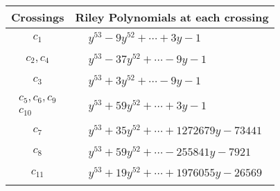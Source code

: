 \documentclass[1p]{elsarticle_modified}
\theoremstyle{definition}
\begin{document}
\begin{tabular}{m{50pt}|m{274pt}}
Crossings & \hspace{64pt}Riley Polynomials at each crossing \\
\hline $$\begin{aligned}c_{1}\end{aligned}$$&$\begin{aligned}
&y^{53}-9 y^{52}+\cdots+3 y-1
\end{aligned}$\\
\hline $$\begin{aligned}c_{2},c_{4}\end{aligned}$$&$\begin{aligned}
&y^{53}-37 y^{52}+\cdots-9 y-1
\end{aligned}$\\
\hline $$\begin{aligned}c_{3}\end{aligned}$$&$\begin{aligned}
&y^{53}+3 y^{52}+\cdots-9 y-1
\end{aligned}$\\
\hline $$\begin{aligned}c_{5},c_{6},c_{9}\\c_{10}\end{aligned}$$&$\begin{aligned}
&y^{53}+59 y^{52}+\cdots+3 y-1
\end{aligned}$\\
\hline $$\begin{aligned}c_{7}\end{aligned}$$&$\begin{aligned}
&y^{53}+35 y^{52}+\cdots+1272679 y-73441
\end{aligned}$\\
\hline $$\begin{aligned}c_{8}\end{aligned}$$&$\begin{aligned}
&y^{53}+59 y^{52}+\cdots-255841 y-7921
\end{aligned}$\\
\hline $$\begin{aligned}c_{11}\end{aligned}$$&$\begin{aligned}
&y^{53}+19 y^{52}+\cdots+1976055 y-26569
\end{aligned}$\\
\hline
\end{tabular}
\vskip 2pc
\end{document}
